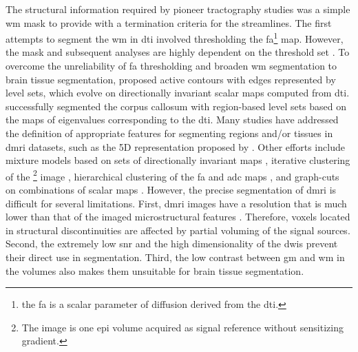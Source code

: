 The structural information required by pioneer tractography studies was a simple
  \gls*{wm} mask to provide with a termination criteria for the streamlines.
The first attempts to segment the \gls*{wm} in \gls*{dti} involved thresholding the
  \gls*{fa}\footnote{the \gls*{fa} is a scalar parameter of diffusion derived from
  the \gls*{dti}.} map.
However, the mask and subsequent analyses are highly dependent on the threshold set
  \citep{taoka_fractional_2009}.
To overcome the unreliability of \gls*{fa} thresholding and broaden \gls*{wm} segmentation
  to brain tissue segmentation, \cite{zhukov_level_2003} proposed active contours with
  edges represented by level sets, which evolve on directionally invariant scalar maps
  computed from \gls*{dti}.
\cite{rousson_level_2004} successfully segmented the corpus callosum with
  region-based level sets based on the maps of eigenvalues corresponding to the
  \gls*{dti}.
Many studies have addressed the definition of appropriate features for segmenting
  regions and/or tissues in \gls*{dmri} datasets, such as the 5D representation
  proposed by \cite{jonasson_segmentation_2005}.
Other efforts include mixture models based on sets of directionally invariant maps
  \citep{liu_brain_2007}, iterative clustering of the \lowb{}\footnote{The \lowb{}
  image is one \gls*{epi} volume acquired as signal reference without sensitizing gradient.}
  image \citep{hadjiprocopis_unbiased_2005},
  hierarchical clustering of the \gls*{fa} and \gls*{adc} maps \citep{lu_segmentation_2008},
  and graph-cuts on combinations of scalar maps \citep{han_experimental_2009}.
However, the precise segmentation of \gls*{dmri} is difficult for several limitations.
First, \gls{dmri} images have a resolution that is much lower than that of the imaged
  microstructural features \citep{basser_microstructural_1996}.
Therefore, voxels located in structural discontinuities are affected by partial
  voluming of the signal sources.
Second, the extremely low \gls*{snr} and the high dimensionality of the \glspl*{dwi} prevent
  their direct use in segmentation.
Third, the low contrast between \gls*{gm} and \gls*{wm} in the \lowb{} volumes also makes
  them unsuitable for brain tissue segmentation.

